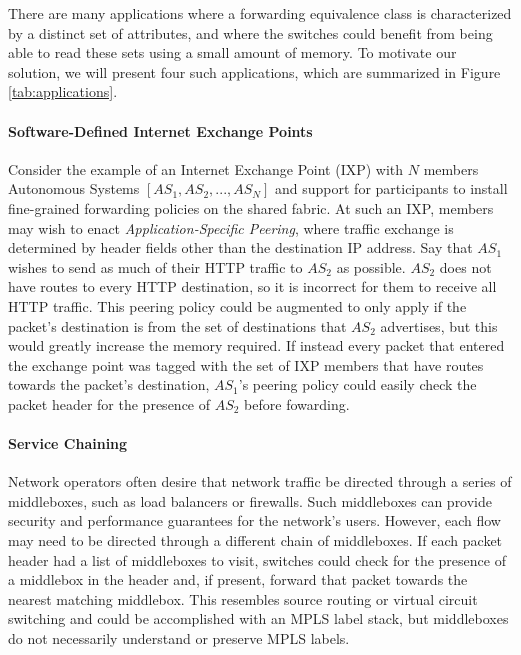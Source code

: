 There are many applications where a forwarding equivalence class is characterized by a distinct set of attributes, and where the switches could benefit from being able to read these sets using a small amount of memory. To motivate our solution, we will present four such applications, which are summarized in Figure \ref{tab:applications}.
 
\paragraph{Software-Defined Internet Exchange Points}
Consider the example of an Internet Exchange Point (IXP) with $N$ members Autonomous Systems $[AS_1, AS_2, ..., AS_N]$ and support for participants to install fine-grained forwarding policies on the shared fabric. At such an IXP, members may wish to enact \textit{Application-Specific Peering}, where traffic exchange is determined by header fields other than the destination IP address. Say that $AS_1$ wishes to send as much of their HTTP traffic to $AS_2$ as possible. $AS_2$ does not have routes to every HTTP destination, so it is incorrect for them to receive all HTTP traffic. This peering policy could be augmented to only apply if the packet's destination is from the set of destinations that $AS_2$ advertises, but this would greatly increase the memory required. If instead every packet that entered the exchange point was tagged with the set of IXP members that have routes towards the packet's destination, $AS_1$'s peering policy could easily check the packet header for the presence of $AS_2$ before fowarding.

\paragraph{Service Chaining}
Network operators often desire that network traffic be directed through a series of middleboxes, such as load balancers or firewalls. Such middleboxes can provide security and performance guarantees for the network's users.
 However, each flow may need to be directed through a different chain of middleboxes. If each packet header had a list of middleboxes to visit, switches could check for the presence of a middlebox in the header and, if present, forward that packet towards the nearest matching middlebox. This resembles source routing or virtual circuit switching and could be accomplished with an MPLS label stack, but middleboxes do not necessarily understand or preserve MPLS labels. 

